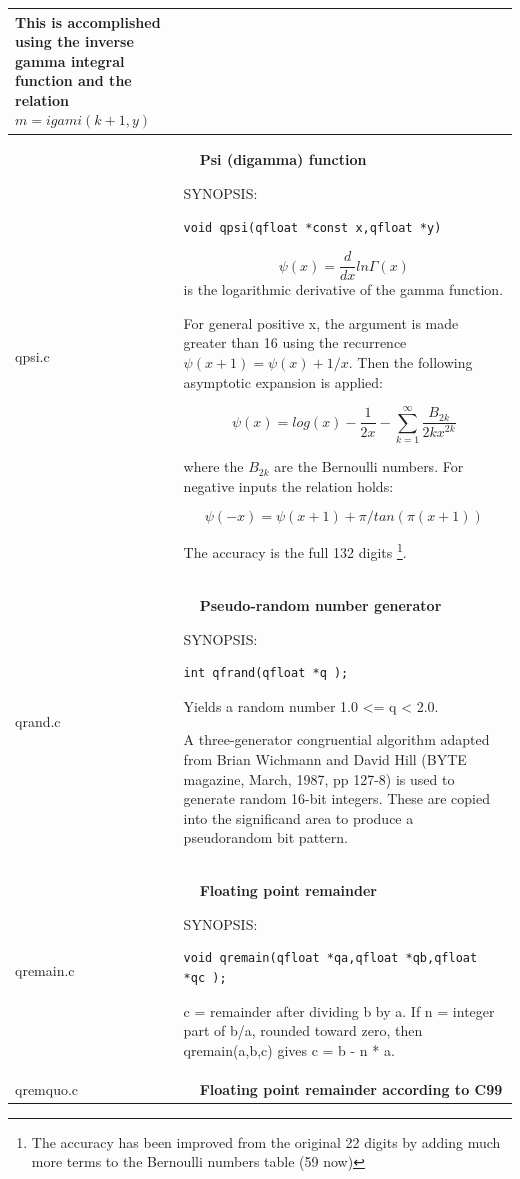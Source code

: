 \documentclass[10pt,a4paper,x11names]{memoir} %
\newcounter{entry}
\newcommand{\TOC}[1] {\addcontentsline{toc}{section}{\theentry\ \  #1} \textbf{\theentry\ \  #1} \par\stepcounter{entry}}
\begin{document}
\begin{longtable}{|p{1.5cm}|p{11.5cm}|}
	This is accomplished using the inverse gamma integral
	function and the relation
	$m = igami( k+1, y )$
	\\\hline
	qpsi.c& \TOC{Psi (digamma) function}
	
	{\footnotesize SYNOPSIS:}\vspace{-0.2cm}\index{qpsi}
	\begin{lstlisting}[numbers=none]
		void qpsi(qfloat *const x,qfloat *y)
	\end{lstlisting}\vspace{-0.2cm}
	
	$$ \psi(x)=\frac{d}{dx} ln \Gamma (x)$$
	is the logarithmic derivative of the gamma function.
	
	For general positive x, the argument is made greater than 16
	using the recurrence  $\psi(x+1) = \psi(x) + 1/x$.
	Then the following asymptotic expansion is applied:
	
	$$ \psi(x)=log(x) -\frac{1}{2x} - \sum_{k=1}^{\infty}\frac{B_{2k}}{2k x^{2k}}$$
	
	where the $B_{2k}$ are the Bernoulli numbers. For negative inputs the relation holds:
	
	$$\psi(-x)  =  \psi(x+1) + \pi/tan(\pi(x+1))$$
	
	The accuracy is the full 132 digits
	\footnote{The accuracy has been improved from the original 22 digits by adding much more terms to the Bernoulli numbers table (59 now)}.
	\\\hline
	qrand.c&\TOC{Pseudo-random number generator}
	
	{\footnotesize SYNOPSIS:}\vspace{-0.2cm}\index{qfrand}
	\begin{lstlisting}[numbers=none]
		int qfrand(qfloat *q );
	\end{lstlisting}\vspace{-0.2cm}
	
	Yields a random number 1.0 <= q < 2.0.
	
	A three-generator congruential algorithm adapted from Brian
	Wichmann and David Hill (BYTE magazine, March, 1987,
	pp 127-8) is used to generate random 16-bit integers.
	These are copied into the significand area to produce
	a pseudorandom bit pattern.
	\\\hline
	qremain.c& \TOC{Floating point remainder}
	
	{\footnotesize SYNOPSIS:}\vspace{-0.2cm}\index{qremain}
	\begin{lstlisting}[numbers=none]
		void qremain(qfloat *qa,qfloat *qb,qfloat *qc );
	\end{lstlisting}\vspace{-0.2cm}
	c = remainder after dividing b by a.
	If n = integer part of b/a, rounded toward zero,
	then qremain(a,b,c) gives c = b - n * a. 
	\\\hline
	qremquo.c& \TOC{Floating point remainder according to C99}
	

\end{longtable}
\end{document}
